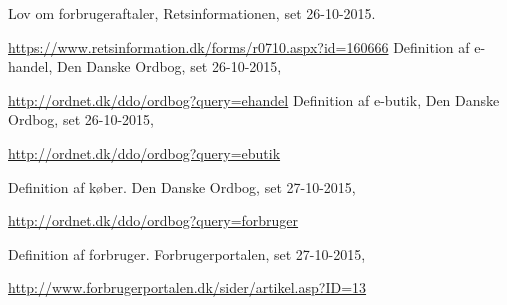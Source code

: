   Lov om forbrugeraftaler,
  Retsinformationen,
  set 26-10-2015.
  
  \url{https://www.retsinformation.dk/forms/r0710.aspx?id=160666}
  Definition af e-handel,
  Den Danske Ordbog,
  set 26-10-2015,
  
  \url{http://ordnet.dk/ddo/ordbog?query=ehandel}
  Definition af e-butik,
  Den Danske Ordbog,
  set 26-10-2015,
  
  \url{http://ordnet.dk/ddo/ordbog?query=ebutik}

  Definition af køber.
  Den Danske Ordbog,
  set 27-10-2015,
  
  \url{http://ordnet.dk/ddo/ordbog?query=forbruger}

  Definition af forbruger.
  Forbrugerportalen,
  set 27-10-2015,
  
  \url{http://www.forbrugerportalen.dk/sider/artikel.asp?ID=13}
